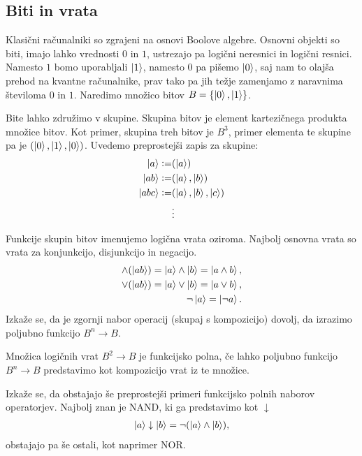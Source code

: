 \documentclass[mat1]{fmfdelo}
\newcommand{\defeq}{\vcentcolon=}
\begin{document}
\subsection{Biti in vrata}
Klasični računalniki so zgrajeni na osnovi Boolove algebre. Osnovni objekti so biti, imajo lahko vrednosti \(0\) in \(1\), ustrezajo pa logični neresnici in logični resnici. Namesto \(1\) bomo uporabljali \(\ket{1}\), namesto \(0\) pa pišemo \(\ket{0}\), saj nam to olajša prehod na kvantne računalnike, prav tako pa jih težje zamenjamo z naravnima številoma \(0\) in \(1\). Naredimo množico bitov \(B = \{\ket0, \ket1\}\).

Bite lahko združimo v skupine. Skupina bitov je element kartezičnega produkta množice bitov. Kot primer, skupina treh bitov je \(B^3\), primer elementa te skupine pa je \((\ket0, \ket1, \ket0)\). Uvedemo preprostejši zapis za skupine: 
\begin{align*}
    \ket{a} \defeq& (\ket a)\\
    \ket{ab} \defeq& (\ket{a},\ket b)\\
    \ket{abc} \defeq& (\ket a, \ket b, \ket c)\\
    &\vdots
\end{align*}

Funkcije skupin bitov imenujemo logična vrata oziroma. Najbolj osnovna vrata so vrata za konjunkcijo, disjunkcijo in negacijo.
\begin{align*}
    \land(\ket{ab}) = \ket{a}\land\ket{b} = \ket{a\land b},\\
    \lor(\ket{ab}) = \ket{a}\lor\ket{b} = \ket{a\lor b},\\
    \lnot\ket{a} = \ket{\lnot a}.
\end{align*}
Izkaže se, da je zgornji nabor operacij (skupaj s kompozicijo) dovolj, da izrazimo poljubno funkcijo \(B^n\to B\).
\begin{definicija}
    Množica logičnih vrat \(B^2\to B\) je funkcijsko polna, če lahko poljubno funkcijo \(B^n\to B\) predstavimo kot kompozicijo vrat iz te množice.
\end{definicija}
Izkaže se, da obstajajo še preprostejši primeri funkcijsko polnih naborov operatorjev. Najbolj znan je NAND, ki ga predstavimo kot \(\downarrow\)
\begin{align*}
    \ket{a}\downarrow \ket{b} = \lnot (\ket{a} \land \ket{b}),
\end{align*}
obstajajo pa še ostali, kot naprimer NOR.\cite{sheffers}
\end{document}
